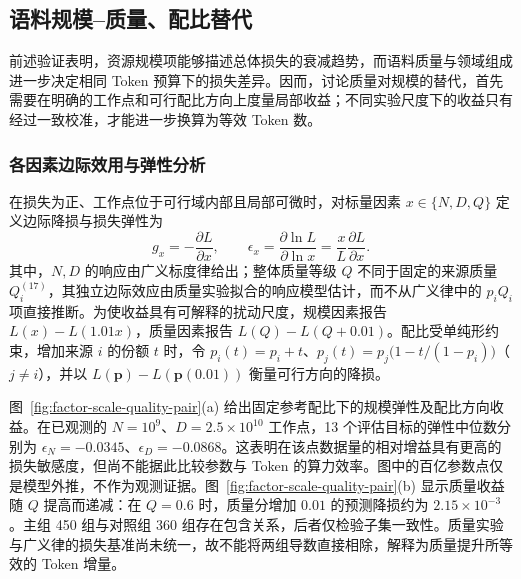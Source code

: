 \documentclass[bwprint]{gmcmthesis}
\begin{document}
\subsection{语料规模--质量、配比替代}

前述验证表明，资源规模项能够描述总体损失的衰减趋势，而语料质量与领域组成进一步决定相同 Token 预算下的损失差异。因而，讨论质量对规模的替代，首先需要在明确的工作点和可行配比方向上度量局部收益；不同实验尺度下的收益只有经过一致校准，才能进一步换算为等效 Token 数。

\subsubsection{各因素边际效用与弹性分析}

在损失为正、工作点位于可行域内部且局部可微时，对标量因素 $x\in\{N,D,Q\}$ 定义边际降损与损失弹性为
\begin{equation}
    g_x=-\frac{\partial L}{\partial x},\qquad
    \epsilon_x=\frac{\partial\ln L}{\partial\ln x}
    =\frac{x}{L}\frac{\partial L}{\partial x}.
    \label{eq:generalized-factor-elasticity}
\end{equation}
其中，$N,D$ 的响应由广义标度律给出；整体质量等级 $Q$ 不同于固定的来源质量 $Q_i^{(17)}$，其独立边际效应由质量实验拟合的响应模型估计，而不从广义律中的 $p_iQ_i$ 项直接推断。为使收益具有可解释的扰动尺度，规模因素报告 $L(x)-L(1.01x)$，质量因素报告 $L(Q)-L(Q+0.01)$。配比受单纯形约束，增加来源 $i$ 的份额 $t$ 时，令 $p_i(t)=p_i+t$、$p_j(t)=p_j\bigl(1-t/(1-p_i)\bigr)$（$j\ne i$），并以 $L(\mathbf p)-L(\mathbf p(0.01))$ 衡量可行方向的降损。

图~\ref{fig:factor-scale-quality-pair}(a) 给出固定参考配比下的规模弹性及配比方向收益。在已观测的 $N=10^9$、$D=2.5\times10^{10}$ 工作点，13 个评估目标的弹性中位数分别为 $\epsilon_N=-0.0345$、$\epsilon_D=-0.0868$。这表明在该点数据量的相对增益具有更高的损失敏感度，但尚不能据此比较参数与 Token 的算力效率。图中的百亿参数点仅是模型外推，不作为观测证据。图~\ref{fig:factor-scale-quality-pair}(b) 显示质量收益随 $Q$ 提高而递减：在 $Q=0.6$ 时，质量分增加 $0.01$ 的预测降损约为 $2.15\times10^{-3}$。主组 450 组与对照组 360 组存在包含关系，后者仅检验子集一致性。质量实验与广义律的损失基准尚未统一，故不能将两组导数直接相除，解释为质量提升所等效的 Token 增量。
\end{document}
